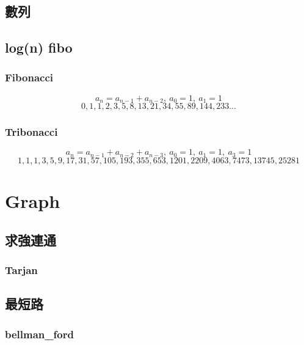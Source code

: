 \subsection{數列}

\subsection{log(n) fibo} %


\subsubsection{Fibonacci}
\[a_{n} = a_{n-1} + a_{n-2},\ a_0 = 1,\ a_1 = 1\]
\[0, 1, 1, 2, 3, 5, 8, 13, 21, 34, 55, 89, 144, 233...\]

\subsubsection{Tribonacci}
\[a_{n} = a_{n-1} + a_{n-2} + a_{n-3},\ a_0 = 1,\ a_1 = 1,\ a_3 = 1\]
\[1, 1, 1, 3, 5, 9, 17, 31, 57, 105, 193, 355, 653, 1201, 2209, 4063, 7473, 13745, 25281\]

\section{Graph}


\subsection{求強連通}

\subsubsection{Tarjan}



\subsection{最短路}

\subsubsection{bellman\_ford}


